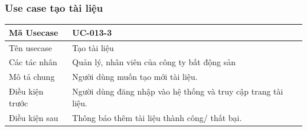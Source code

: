 \documentclass[12pt,a4paper]{article}
\begin{document}
    \subsubsection*{Use case tạo tài liệu}
    \begin{table}[H]
        \centering
        \begin{tabular}{|p{3.5cm}|p{11.5cm}|c|}
            \hline
            Mã Usecase      & UC-013-3                                                      \\
            \hline
            Tên usecase     & Tạo tài liệu                                                  \\
            \hline
            Các tác nhân    & Quản lý, nhân viên của công ty bất động sản                   \\
            \hline
            Mô tả chung     & Người dùng muốn tạo mới tài liệu.                             \\
            \hline

            Điều kiện trước & Người dùng đăng nhập vào hệ thống và truy cập trang tài liệu. \\
            \hline

            Điều kiện sau   & Thông báo thêm tài liệu thành công/ thất bại.                 \\
            \hline


\end{tabular}
\end{table}
\end{document}
